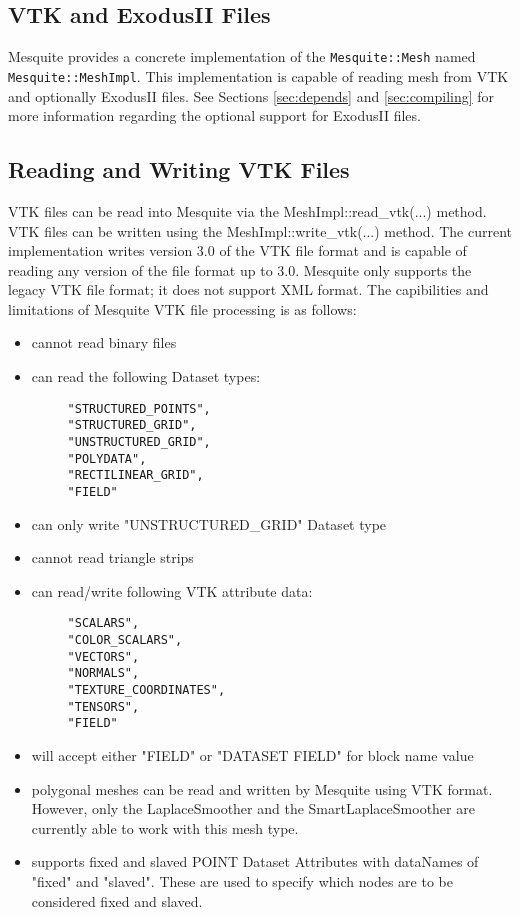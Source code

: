 \subsection{VTK and ExodusII Files}

Mesquite provides a concrete implementation of the \texttt{Mesquite::Mesh} named
\texttt{Mesquite::MeshImpl}.  This implementation is capable of reading mesh from
VTK\cite{VTKbook, VTKuml} and optionally ExodusII files. See Sections 
\ref{sec:depends} and \ref{sec:compiling} for more 
information regarding the optional support for ExodusII files.

\subsection{Reading and Writing VTK Files}

VTK files can be read into Mesquite via the MeshImpl::read\_vtk(...) method.  VTK files can be written using the MeshImpl::write\_vtk(...) method. 
 The current implementation writes version 3.0 of the VTK file format
and is capable of reading any version of the file format up to 3.0. Mesquite only supports the legacy VTK file format; it does not support XML format.  The capibilities and limitations of Mesquite VTK file processing is as follows:
\begin{itemize}
\item cannot read binary files
\item can read the following Dataset types:
\begin {verbatim}
     "STRUCTURED_POINTS",
     "STRUCTURED_GRID",
     "UNSTRUCTURED_GRID",
     "POLYDATA",
     "RECTILINEAR_GRID",
     "FIELD"
\end{verbatim}
\item can only write "UNSTRUCTURED\_GRID" Dataset type
\item cannot read triangle strips
\item can read/write following VTK attribute data:
\begin {verbatim}
     "SCALARS",
     "COLOR_SCALARS",
     "VECTORS",
     "NORMALS",
     "TEXTURE_COORDINATES",
     "TENSORS",
     "FIELD"
\end{verbatim}
\item will accept either "FIELD" or "DATASET FIELD" for block name value
\item polygonal meshes can be read and written by Mesquite using VTK format.  However, only the LaplaceSmoother and the SmartLaplaceSmoother are currently able to work with this mesh type.
\item supports fixed and slaved POINT Dataset Attributes with dataNames of "fixed" and "slaved".  These are used to specify which nodes are to be considered fixed and slaved.
\end{itemize}

